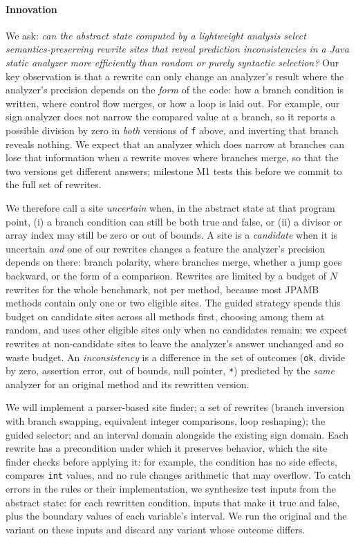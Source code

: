 \documentclass[review,nonacm,acmsmall]{acmart}
\begin{document}
\paragraph{Innovation}
We ask: \emph{can the abstract state computed by a lightweight analysis select
semantics-preserving rewrite sites that reveal prediction inconsistencies in a
Java static analyzer more efficiently than random or purely syntactic
selection?} Our key observation is that a rewrite can only change an
analyzer's result where the analyzer's precision depends on the \emph{form} of
the code: how a branch condition is written, where control flow merges, or how
a loop is laid out. For example, our sign analyzer does not narrow the
compared value at a branch, so it reports a possible division by zero in
\emph{both} versions of \texttt{f} above, and inverting that branch reveals
nothing. We expect that an analyzer which does narrow at branches can lose
that information when a rewrite moves where branches merge, so that the two
versions get different answers; milestone M1 tests this before we commit to
the full set of rewrites.

We therefore call a site \emph{uncertain} when, in the abstract state at that
program point, (i) a branch condition can still be both true and false, or
(ii) a divisor or array index may still be zero or out of bounds. A site is a
\emph{candidate} when it is uncertain \emph{and} one of our rewrites changes a
feature the analyzer's precision depends on there: branch polarity, where
branches merge, whether a jump goes backward, or the form of a comparison.
Rewrites are limited by a budget of $N$ rewrites for the whole benchmark, not
per method, because most JPAMB methods contain only one or two eligible sites.
The guided strategy spends this budget on candidate sites across all methods
first, choosing among them at random, and uses other eligible sites only when
no candidates remain; we expect rewrites at non-candidate sites to leave the
analyzer's answer unchanged and so waste budget. An \emph{inconsistency} is a
difference in the set of outcomes (\texttt{ok}, divide by zero, assertion
error, out of bounds, null pointer, \texttt{*}) predicted by the \emph{same}
analyzer for an original method and its rewritten version.

We will implement a parser-based site finder; a set of rewrites (branch
inversion with branch swapping, equivalent integer comparisons, loop
reshaping); the guided selector; and an interval domain alongside the existing
sign domain. Each rewrite has a precondition under which it preserves
behavior, which the site finder checks before applying it: for example, the
condition has no side effects, compares \texttt{int} values, and no rule
changes arithmetic that may overflow. To catch errors in the rules or their
implementation, we synthesize test inputs from the abstract state: for each
rewritten condition, inputs that make it true and false, plus the boundary
values of each variable's interval. We run the original and the variant on
these inputs and discard any variant whose outcome differs.
\end{document}
